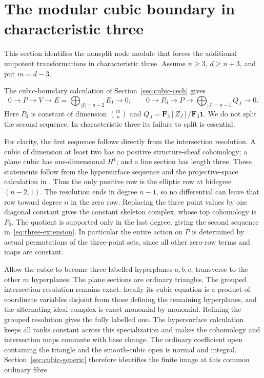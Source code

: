 \section{The modular cubic boundary in characteristic three}\label{sec:higher-three-modular}
This section identifies the nonsplit node module that forces the additional unipotent transformations in characteristic three. Assume $n\ge3$, $d\ge n+3$, and put $m=d-3$.

The cubic-boundary calculation of Section~\ref{sec:cubic-cech} gives
\begin{equation}\label{eq:three-extension}
0\longrightarrow P\longrightarrow V\longrightarrow
E=\bigoplus_{|I|=n-2}E_I\longrightarrow0,
\qquad
0\longrightarrow P_0\longrightarrow P\longrightarrow
\bigoplus_{|J|=n-1}Q_J\longrightarrow0.
\end{equation}
Here $P_0$ is constant of dimension $\binom mn$ and $Q_J=\mathbf F_3[Z_J]/\mathbf F_3\mathbf1$. We do not split the second sequence. In characteristic three its failure to split is essential.

For clarity, the first sequence follows directly from the intersection resolution. A cubic of dimension at least two has no positive structure-sheaf cohomology; a plane cubic has one-dimensional $H^1$; and a line section has length three. These statements follow from the hypersurface sequence and the projective-space calculation in \citet[Lemmas~30.8.1--30.8.2]{StacksProjective}. Thus the only positive row is the elliptic row at bidegree $(n-2,1)$. The resolution ends in degree $n-1$, so no differential can leave that row toward degree $n$ in the zero row. Replacing the three point values by one diagonal constant gives the constant skeleton complex, whose top cohomology is $P_0$. The quotient is supported only in the last degree, giving the second sequence in~\eqref{eq:three-extension}. In particular the entire action on $P$ is determined by actual permutations of the three-point sets, since all other zero-row terms and maps are constant.

Allow the cubic to become three labelled hyperplanes $a,b,c$, transverse to the other $m$ hyperplanes. The plane sections are ordinary triangles. The grouped intersection resolution remains exact: locally its cubic equation is a product of coordinate variables disjoint from those defining the remaining hyperplanes, and the alternating ideal complex is exact monomial by monomial. Refining the grouped resolution gives the fully labelled one. The hypersurface calculation keeps all ranks constant across this specialization and makes the cohomology and intersection maps commute with base change. The ordinary coefficient open containing the triangle and the smooth-cubic open is normal and integral. Section~\ref{sec:cubic-generic} therefore identifies the finite image at this common ordinary fibre.

